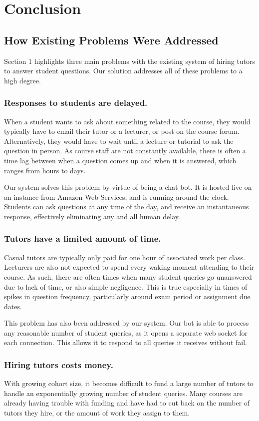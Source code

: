 \section{Conclusion}
\subsection{How Existing Problems Were Addressed}
Section 1 highlights three main problems with the existing system of hiring tutors to answer student questions. Our solution addresses all of these problems to a high degree.

\subsubsection{Responses to students are delayed.}
When a student wants to ask about something related to the course, they would typically have to email their tutor or a lecturer, or post on the course forum. Alternatively, they would have to wait until a lecture or tutorial to ask the question in person. As course staff are not constantly available, there is often a time lag between when a question comes up and when it is answered, which ranges from hours to days.

Our system solves this problem by virtue of being a chat bot. It is hosted live on an  instance from Amazon Web Services, and is running around the clock. Students can ask questions at any time of the day, and receive an instantaneous response, effectively eliminating any and all human delay.

\subsubsection{Tutors have a limited amount of time.}
Casual tutors are typically only paid for one hour of associated work per class. Lecturers are also not expected to spend every waking moment attending to their course. As such, there are often times when many student queries go unanswered due to lack of time, or also simple negligence. This is true especially in times of spikes in question frequency, particularly around exam period or assignment due dates.

This problem has also been addressed by our system. Our bot is able to process any reasonable number of student queries, as it opens a separate web socket for each connection. This allows it to respond to all queries it receives without fail.

\subsubsection{Hiring tutors costs money.}
With growing cohort size, it becomes difficult to fund a large number of tutors to handle an exponentially growing number of student queries. Many courses are already having trouble with funding and have had to cut back on the number of tutors they hire, or the amount of work they assign to them.

